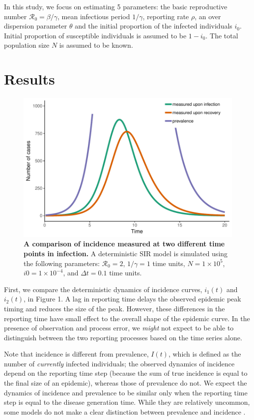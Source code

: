 \documentclass[12pt]{article}\usepackage[]{graphicx}\usepackage[]{color}
\begin{document}
In this study, we focus on estimating 5 parameters: the basic reproductive
number $\mathcal R_0 = \beta/\gamma$, mean infectious period $1/\gamma$, 
reporting rate $\rho$, an over dispersion parameter $\theta$ and the initial
proportion of the infected individuals $i_0$. Initial proportion of
susceptible individuals is assumed to be $1 - i_0$. The total population
size $N$ is assumed to be known.

\section{Results}

\begin{figure}[!t]
\includegraphics[width=\textwidth]{../figure/example.pdf}
\caption{
\textbf{A comparison of incidence measured at two different time points in infection.}
A deterministic SIR model is simulated using the following parameters: 
$\mathcal R_0 = 2$, $1/\gamma = 1$ time units, $N = 1 \times 10^5$, $i0 = 1 \times 10^{-4}$,
and $\Delta t = 0.1$ time units.
}
\end{figure}

First, we compare the deterministic dynamics of incidence curves,
$i_1(t)$ and $i_2(t)$, in Figure 1. A lag in reporting time delays
the observed epidemic peak timing and reduces the size of the peak. However, 
these differences in the reporting time have small effect to the overall shape 
of the epidemic curve. In the presence of observation and process error, we 
\emph{might} not expect to be able to distinguish between the two reporting processes
based on the time series alone. 

Note that incidence is different from prevalence,
$I(t)$, which is defined as the number of \emph{currently} infected individuals;
the observed dynamics of incidence depend on the reporting time step (because the sum of 
true incidence is equal to the final size of an epidemic), whereas those of
prevalence do not. We expect the dynamics of incidence and prevalence to be similar only when
the reporting time step is equal to the disease generation time. While they are relatively
uncommon, some models do not make a clear distinction between prevalence and 
incidence 
\citep{capistran2009parameter, hooker2010parameterizing, yang2013stability, gonzalez2014fractional}.
\end{document}
